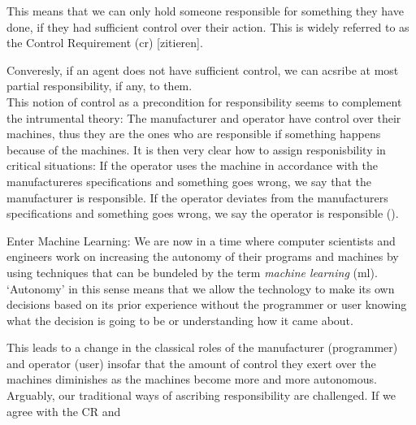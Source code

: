 \documentclass{article}
\begin{document}
\vspace{.8em}
This means that we can only hold someone responsible for something they have
done, if they had sufficient control over their action.
This is widely referred to as the Control Requirement (\acrshort{cr}) [zitieren].

Converesly, if an agent does not have sufficient control, we can acsribe at most
partial responsibility, if any, to them.\\ 

This notion of control as a
precondition for responsibility seems to complement the intrumental theory: The
manufacturer and operator have control over their machines, thus they are the
ones who are responsible if something happens because of the machines. It is
then very clear how to assign responisbility in critical situations: If the
operator uses the machine in accordance with the manufactureres specifications
and something goes wrong, we say that the manufacturer is responsible. If the
operator deviates from the manufacturers specifications and something goes
wrong, we say the operator is responsible (\cite[p.175]{Matthias_2004}).

Enter Machine Learning:
We are now in a time where computer scientists and engineers work on increasing
the autonomy of their programs and machines by using techniques that can be
bundeled by the term \textit{machine learning} (\acrshort{ml}). `Autonomy' in this sense
means that we allow the technology to make its own decisions based on its
prior experience without the programmer or user knowing what the decision is
going to be or understanding how it came about.




This leads to a change in the classical roles of the manufacturer
(programmer) and operator (user) insofar that the amount of control they exert
over the machines diminishes as the machines become more and more autonomous.
Arguably, our traditional ways of ascribing responsibility are challenged. If we
agree with the CR and 

\end{document}
